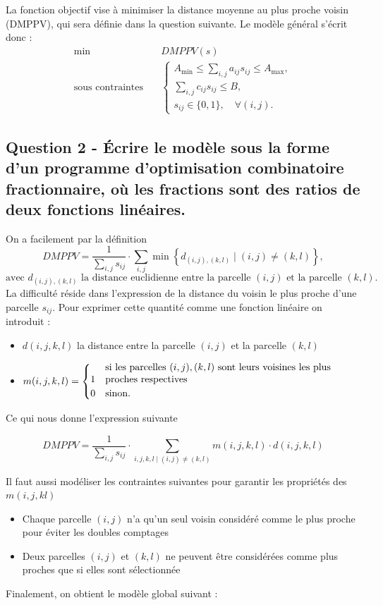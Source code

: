 \documentclass[a4paper,11pt]{article}
\begin{document}
La fonction objectif vise à minimiser la distance moyenne au plus proche voisin (DMPPV), qui sera définie dans la question suivante. Le modèle général s’écrit donc :
\[
\begin{aligned}
\min \quad & DMPPV(s) \\
\text{sous contraintes} \quad &
\begin{cases}
A_{\min} \leq \displaystyle\sum_{i,j} a_{ij} s_{ij} \leq A_{\max},\\[8pt]
\displaystyle\sum_{i,j} c_{ij} s_{ij} \leq B,\\[8pt]
s_{ij} \in \{0,1\}, \quad \forall (i,j).
\end{cases}
\end{aligned}
\]

\subsection{Question 2 -  Écrire le modèle sous la forme d'un programme d'optimisation combinatoire fractionnaire, où les fractions sont des ratios de deux fonctions linéaires.}

On a facilement par la définition
\[
DMPPV =
\frac{1}{\sum_{i,j} s_{ij}} 
\cdot 
\sum_{i,j} 
\min \left\{ d_{(i,j),(k,l)} \;\big|\; (i,j) \neq (k,l) \right\}, 
\]
\[
\text{avec $d_{(i,j),(k,l)}$ la distance euclidienne entre la parcelle $(i,j)$ et la parcelle $(k,l)$.}
\]
La difficulté réside dans l'expression de la distance du voisin le plus proche d'une parcelle $s_{ij}$.
Pour exprimer cette quantité comme une fonction linéaire on introduit : 
\begin{itemize}
    \item $d(i, j, k, l)$ la distance entre la parcelle $(i,j)$ et la parcelle $(k,l)$
    \item { $ 
    m(i, j, k, l) = 
    \begin{cases}
        1 & \shortstack[l]{si les parcelles $(i,j),(k,l)$ sont leurs voisines les plus \\ proches respectives} \\
        0 & \text{sinon.}
    \end{cases}
        $
    }
\end{itemize}
Ce qui nous donne l'expression suivante 

\[
    DMPPV = \frac{1}{\sum_{i,j} s_{ij}} 
    \cdot 
    \sum_{i,j,k,l \;\big|\; (i,j) \neq (k,l)} m(i,j,k,l) \cdot d(i,j,k,l) 
\]

Il faut aussi modéliser les contraintes suivantes pour garantir les propriétés des $m(i,j,kl)$
\begin{itemize}
    \item Chaque parcelle $(i,j)$ n'a qu'un seul voisin considéré comme le plus proche pour éviter les doubles comptages
    \item Deux parcelles $(i,j)$ et $(k,l)$ ne peuvent être considérées comme plus proches que si elles sont sélectionnée
\end{itemize}
Finalement, on obtient le modèle global suivant : 
\end{document}
